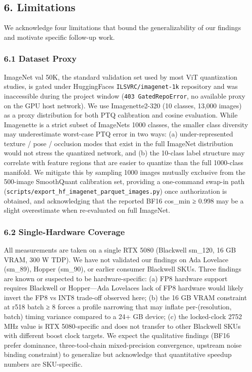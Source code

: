 \documentclass[
]{article}
\begin{document}
\subsection{6. Limitations}\label{6-limitations}

We acknowledge four limitations that bound the generalizability of our
findings and motivate specific follow-up work.

\subsubsection{6.1 Dataset Proxy}\label{61-dataset-proxy}

ImageNet val 50K, the standard validation set used by most ViT
quantization studies, is gated under HuggingFace\textquotesingle s
\texttt{ILSVRC/imagenet-1k} repository and was inaccessible during the
project window (\texttt{403\ GatedRepoError}, no available proxy on the
GPU host network). We use Imagenette2-320 (10 classes, 13,000 images) as
a proxy distribution for both PTQ calibration and cosine evaluation.
While Imagenette is a strict subset of ImageNet\textquotesingle s 1000
classes, the smaller class diversity may underestimate worst-case PTQ
error in two ways: (a) under-represented texture / pose / occlusion
modes that exist in the full ImageNet distribution would not stress the
quantized network, and (b) the 10-class label structure may correlate
with feature regions that are easier to quantize than the full
1000-class manifold. We mitigate this by sampling 1000 images mutually
exclusive from the 500-image SmoothQuant calibration set, providing a
one-command swap-in path
(\texttt{scripts/export\_hf\_imagenet\_parquet\_images.py}) once
authorization is obtained, and acknowledging that the reported BF16
cos\_min ≥ 0.998 may be a slight overestimate when re-evaluated on full
ImageNet.

\subsubsection{6.2 Single-Hardware
Coverage}\label{62-single-hardware-coverage}

All measurements are taken on a single RTX 5080 (Blackwell sm\_120, 16
GB VRAM, 300 W TDP). We have not validated our findings on Ada Lovelace
(sm\_89), Hopper (sm\_90), or earlier consumer Blackwell SKUs. Three
findings are known or suspected to be hardware-specific: (a) FP8
hardware support requires Blackwell or Hopper---Ada
Lovelace\textquotesingle s lack of FP8 hardware would likely invert the
FP8 vs INT8 trade-off observed here; (b) the 16 GB VRAM constraint at
r518 batch ≥ 8 forces a profile narrowing that may inflate
per-(resolution, batch) timing variance compared to a 24+ GB device; (c)
the locked-clock 2752 MHz value is RTX 5080-specific and does not
transfer to other Blackwell SKUs with different boost clock targets. We
expect the qualitative findings (BF16 prefer dominance, three-tool-chain
mixed-precision convergence, upstream noise binding constraint) to
generalize but acknowledge that quantitative speedup numbers are
SKU-specific.
\end{document}
